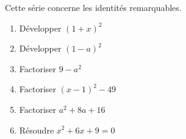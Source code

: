 
\begin{exercice}\label{exosmath-0017}

    \begin{multicols}{2}
        Cette série concerne les identités remarquables.
        \begin{enumerate}
            \item
                 Développer \( (1+x)^2\)
             \item
                 Développer \( (1-a)^2\)
             \item
                 Factoriser \( 9-a^2\)
             \item
                 Factoriser \( (x-1)^2-49\)
             \item
                 Factoriser \( a^2+8a+16\)
             \item
                 Résoudre \( x^2+6x+9=0\)
        \end{enumerate}
    \end{multicols}

\end{exercice}
